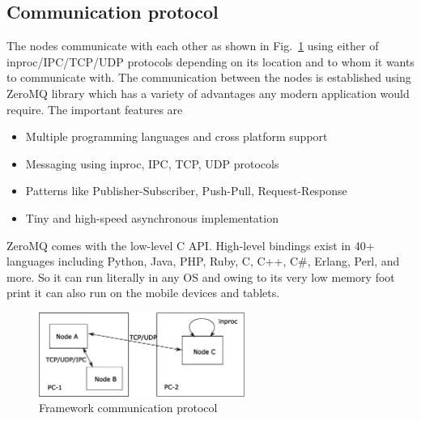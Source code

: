 \subsection{Communication protocol}	
The nodes communicate with each other as shown in Fig.~\ref{fig:framework} using either of inproc/IPC/TCP/UDP protocols depending on its location and to whom it wants to communicate with. The communication between the nodes is established using ZeroMQ \cite{ZeroMQ} library which has a variety of advantages any modern application would require. The important features are
\begin{itemize}[leftmargin={1cm},topsep={0pt},itemsep={0pt},partopsep={0pt},parsep={0pt}] 
\item Multiple programming languages and cross platform support
\item Messaging using inproc, IPC, TCP, UDP protocols
\item Patterns like Publisher-Subscriber, Push-Pull, Request-Response
\item Tiny and high-speed asynchronous implementation
\end{itemize}
ZeroMQ comes with the low-level C API. High-level bindings exist in 40+ languages including Python, Java, PHP, Ruby, C, C++, C\#, Erlang, Perl, and more. So it can run literally in any OS and owing to its very low memory foot print it can also run on the mobile devices and tablets.
\begin{figure}[H]
\centering
\includegraphics[width=0.6\textwidth]{assets/architecture_comm.eps}
\caption[Framework communication protocol]{Framework communication protocol}
\label{fig:framework}
\end{figure}
